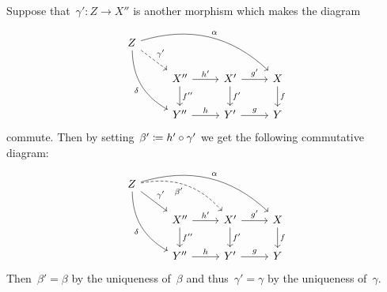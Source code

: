 Suppose that~$\gamma' \colon Z \to X''$ is another morphism which makes the diagram
\[
  \begin{tikzcd}
      Z
      \arrow[bend left]{drrr}[above right]{\alpha}
      \arrow[dashed]{dr}[above right]{\gamma'}
      \arrow[bend right]{ddr}[below left]{\delta}
    & {}
    & {}
    & {}
    \\
      {}
    & X''
      \arrow{r}[above]{h'}
      \arrow{d}[right]{f''}
    & X'
      \arrow{r}[above]{g'}
      \arrow{d}[right]{f'}
    & X
      \arrow{d}[right]{f}
    \\
      {}
    & Y''
      \arrow{r}[above]{h}
    & Y'
      \arrow{r}[above]{g}
    & Y
  \end{tikzcd}
\]
commute.
Then by setting~$\beta' \coloneqq h' \circ \gamma'$ we get the following commutative diagram:
\[
  \begin{tikzcd}
      Z
      \arrow[bend left]{drrr}[above right]{\alpha}
      \arrow[dashed, bend left]{drr}[below left]{\beta'}
      \arrow{dr}[above right]{\gamma'}
      \arrow[bend right]{ddr}[below left]{\delta}
    & {}
    & {}
    & {}
    \\
      {}
    & X''
      \arrow{r}[above]{h'}
      \arrow{d}[right]{f''}
    & X'
      \arrow{r}[above]{g'}
      \arrow{d}[right]{f'}
    & X
      \arrow{d}[right]{f}
    \\
      {}
    & Y''
      \arrow{r}[above]{h}
    & Y'
      \arrow{r}[above]{g}
    & Y
  \end{tikzcd}
\]
Then~$\beta' = \beta$ by the uniqueness of~$\beta$ and thus~$\gamma ' = \gamma$ by the uniqueness of~$\gamma$.





\subsection{}

